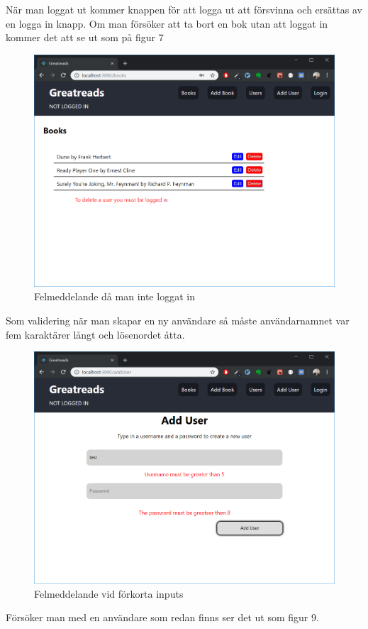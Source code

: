 \documentclass{article}
\begin{document}
\noindent
När man loggat ut kommer knappen för att logga ut att försvinna och ersättas av en logga in knapp. 
Om man försöker att ta bort en bok utan att loggat in kommer det att se ut som på figur 7
\begin{figure}[H]
	\centering
	\includegraphics[width=0.8\linewidth]{Images/booksMustLogg.PNG}
	\caption{Felmeddelande då man inte loggat in}
	\label{fig:deletebooks}
\end{figure}
\noindent
Som validering när man skapar en ny användare så måste användarnamnet var fem karaktärer långt och lösenordet åtta. 
\begin{figure}[H]
	\centering
	\includegraphics[width=0.8\linewidth]{Images/addUserFelMedd.PNG}
	\caption{Felmeddelande vid förkorta inputs}
	\label{fig:}
\end{figure}
Försöker man med en användare som redan finns ser det ut som figur 9.
\end{document}
